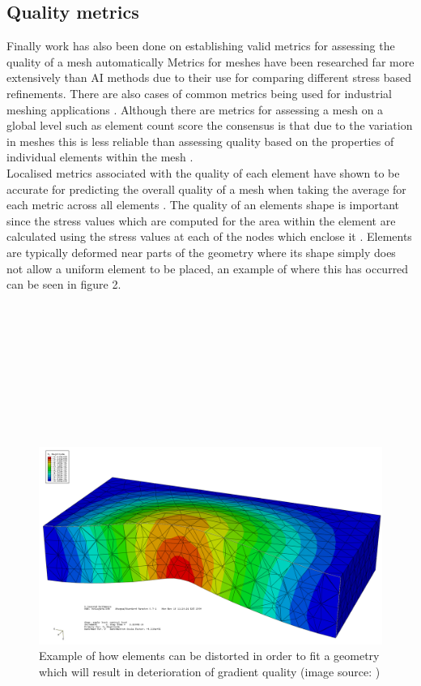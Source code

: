 \subsection{Quality metrics}
\noindent
Finally work has also been done on establishing valid metrics for assessing the quality of a mesh automatically \cite{DittmerMeshQualityMet, NeuralNetworks} Metrics for meshes have been researched far more extensively than AI methods due to their use for comparing different stress based refinements. There are also cases of common metrics being used for industrial meshing applications \cite{DittmerMeshQualityMet}. Although there are metrics for assessing a mesh on a global level such as element count score the consensus is that due to the variation in meshes this is less reliable than assessing quality based on the properties of individual elements within the mesh \cite{DittmerMeshQualityMet}. \\

\noindent
Localised metrics associated with the quality of each element have shown to be accurate for predicting the overall quality of a mesh when taking the average for each metric across all elements \cite{DittmerMeshQualityMet}. The quality of an elements shape is important since the stress values which are computed for the area within the element are calculated using the stress values at each of the nodes which enclose it \cite{IntroductionToFE}. Elements are typically deformed near parts of the geometry where its shape simply does not allow a uniform element to be placed, an example of where this has occurred can be seen in figure 2.\\ \\ \\ \\ \\ \\ \\ \\ \\ \\ 

\begin{figure}[!h]
  \centerline{\includegraphics[width=120mm, scale=1]{../Graphics/MeshQualityDeterioration.png}}
  \caption{Example of how elements can be distorted in order to fit a geometry which will result in deterioration of gradient quality (image source: \cite{PoorFEElementShapes})}
\end{figure}


